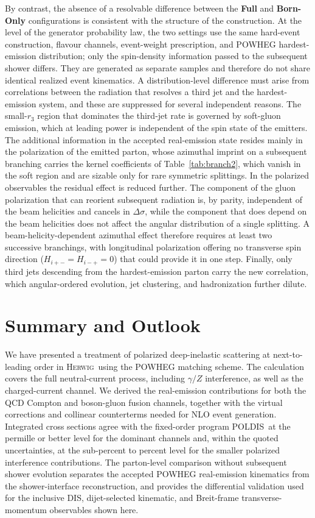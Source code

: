 \documentclass[a4paper,11pt]{article}
\newcommand{\Herwig}{\textsc{Herwig}}
\newcommand{\POLDIS}{\textsc{POLDIS}}
\begin{document}
By contrast, the absence of a resolvable difference between the \textbf{Full} and
\textbf{Born-Only} configurations is consistent with the structure of the
construction. At the level of the generator probability law, the two settings
use the same hard-event construction, flavour channels, event-weight
prescription, and POWHEG hardest-emission distribution; only the spin-density
information passed to the subsequent shower differs. They are generated as
separate samples and therefore do not share identical realized event
kinematics. A distribution-level difference must arise from correlations
between the radiation that resolves a third jet and the hardest-emission
system, and these are suppressed for several independent reasons. The
small-$r_3$ region that dominates the
third-jet rate is governed by soft-gluon emission, which at leading power
is independent of the spin state of the emitters. The additional
information in the accepted real-emission state resides mainly in the
polarization of the emitted parton, whose azimuthal imprint on a subsequent
branching carries the kernel coefficients of Table~\ref{tab:branch2},
which vanish in the soft region and are sizable only for rare symmetric
splittings. In the polarized observables the residual effect is reduced further. The
component of the gluon polarization that can reorient subsequent radiation
is, by parity, independent of the beam helicities and cancels in
$\Delta\sigma$, while the component that does depend on the beam helicities
does not affect the angular distribution of a single splitting. A
beam-helicity-dependent azimuthal effect therefore requires at least two
successive branchings, with longitudinal polarization offering no
transverse spin direction ($H_{i+-}=H_{i-+}=0$) that could provide it in
one step. Finally, only third jets
descending from the hardest-emission parton carry the new correlation,
which angular-ordered evolution, jet clustering, and hadronization further
dilute.

\FloatBarrier
\section{Summary and Outlook}\label{sec:conclusions}

We have presented a treatment of polarized deep-inelastic scattering at
next-to-leading order in \Herwig\ using the POWHEG matching scheme. The
calculation covers the full neutral-current process, including $\gamma/Z$
interference, as well as the charged-current channel. We derived the
real-emission contributions for both the QCD Compton and boson-gluon fusion
channels, together with the virtual corrections and collinear counterterms
needed for NLO event generation. Integrated cross sections agree with the
fixed-order program \POLDIS\ at the permille or better level for the dominant
channels and, within the quoted uncertainties, at the sub-percent to percent
level for the smaller polarized interference contributions.
The parton-level comparison without subsequent shower evolution separates the
accepted POWHEG real-emission kinematics from the shower-interface
reconstruction, and provides the differential validation used for the inclusive
DIS, dijet-selected kinematic, and Breit-frame transverse-momentum observables
shown here.
\end{document}
